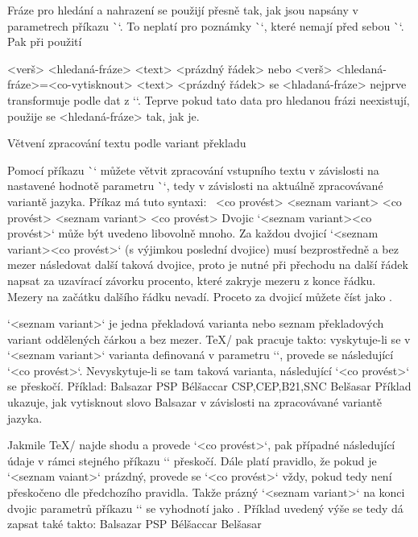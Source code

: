 Fráze pro hledání a nahrazení se použijí přesně tak, jak jsou napsány v
parametrech příkazu \`\ww`. To neplatí pro poznámky \`\Note`, které nemají
před sebou \`\ww`. Pak při použití

\begtt
\Note <verš> {<hledaná-fráze>} <text> <prázdný řádek>
\endtt
nebo
\begtt
\Note <verš> {<hledaná-fráze>}={<co-vytisknout>} <text> <prázdný řádek>
\endtt
se <hladaná-fráze> nejprve transformuje podle dat z `\vdef`. Teprve pokud
tato data pro hledanou frázi neexistují, použije se <hledaná-fráze> tak,
jak je.


\secc Větvení zpracování textu podle variant překladu

Pomocí příkazu \`\switch` můžete větvit zpracování vstupního textu v
závislosti na nastavené hodnotě parametru \`\tmark`, tedy v závislosti na
aktuálně zpracovávané variantě jazyka. Příkaz má tuto syntaxi:
\begtt
{} {<co provést>}%
        {<seznam variant>} {<co provést>}%
        {<seznam variant>} {<co provést>}
\endtt
Dvojic `{<seznam variant>}{<co provést>}` může být uvedeno libovolně mnoho.
Za každou dvojicí `{<seznam variant>}{<co provést>}` (s výjimkou poslední
dvojice) musí bezprostředně a bez mezer následovat další taková dvojice,
proto je nutné při přechodu na
další řádek napsat za uzavírací závorku procento, které zakryje mezeru z
konce řádku. Mezery na začátku dalšího řádku nevadí.
Proceto za dvojicí můžete číst jako .

`<seznam variant>` je
jedna překladová varianta nebo seznam překladových variant oddělených
čárkou a bez mezer. \TeX/ pak pracuje takto: vyskytuje-li
se v `<seznam variant>` varianta definovaná v parametru `\tmark`, provede se
následující `<co provést>`. Nevyskytuje-li se tam taková varianta,
následující `<co provést>` se přeskočí. Příklad:
\begtt
{} {Balsazar}%
        {PSP} {Bélšaccar}%
        {CSP,CEP,B21,SNC} {Belšasar}
\endtt
Příklad ukazuje, jak vytisknout slovo Balsazar v závislosti na
zpracovávané variantě jazyka.

Jakmile \TeX/ najde shodu a provede `<co provést>`, pak případné následující
údaje v rámci stejného příkazu `\switch` přeskočí. Dále platí pravidlo, že
pokud je `<seznam vaiant>` prázdný, provede se `<co provést>` vždy, pokud
tedy není přeskočeno dle předchozího pravidla. Takže prázný `<seznam variant>` na
konci dvojic parametrů příkazu `\switch` se vyhodnotí jako . Příklad uvedený výše se tedy dá zapsat také takto:
\begtt
{} {Balsazar}%
        {PSP} {Bélšaccar}%
        {}    {Belšasar}
\endtt

